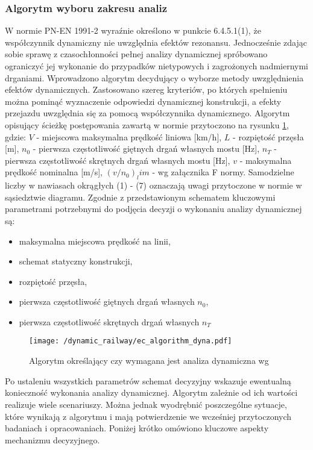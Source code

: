 \subsubsection{Algorytm wyboru zakresu analiz}
W normie PN-EN 1991-2 wyraźnie określono w punkcie 6.4.5.1(1), że współczynnik dynamiczny nie uwzględnia efektów rezonansu. Jednocześnie zdając sobie sprawę z czasochłonności pełnej analizy dynamicznej spróbowano ograniczyć jej wykonanie do przypadków nietypowych i zagrożonych nadmiernymi drganiami. Wprowadzono algorytm decydujący o wyborze metody uwzględnienia efektów dynamicznych. Zastosowano szereg kryteriów, po których spełnieniu można pominąć wyznaczenie odpowiedzi dynamicznej konstrukcji, a efekty przejazdu uwzględnia się za pomocą współczynnika dynamicznego. Algorytm opisujący ścieżkę postępowania zawartą w normie przytoczono na rysunku \ref{fig:ec_algorithm_dyna}, gdzie: $V$ - miejscowa maksymalna prędkość liniowa [km/h], $L$ - rozpiętość przęsła [m], $n_0$ - pierwsza częstotliwość giętnych drgań własnych mostu [Hz], $n_T$ - pierwsza częstotliwość skrętnych drgań własnych mostu [Hz], $v$ - maksymalna prędkość nominalna [m/s], $(v/n_0)_lim$ - wg załącznika F normy. Samodzielne liczby w nawiasach okrągłych (1) - (7) oznaczają uwagi przytoczone w normie w sąsiedztwie diagramu. Zgodnie z przedstawionym schematem kluczowymi parametrami potrzebnymi do podjęcia decyzji o wykonaniu analizy dynamicznej są:
\begin{itemize}[noitemsep]
	\item maksymalna miejscowa prędkość na linii,
	\item schemat statyczny konstrukcji,
	\item rozpiętość przęsła,
	\item pierwsza częstotliwość giętnych drgań własnych $n_0$,
	\item pierwsza częstotliwość skrętnych drgań własnych $n_T$
\end{itemize}
\begin{figure}[p]
	\centering
	\texttt{[image: /dynamic\_railway/ec\_algorithm\_dyna.pdf]} 
	\captionsetup{justification=centering}
	\caption{Algorytm określający czy wymagana jest analiza dynamiczna wg \parencite{PKNj}}
	\label{fig:ec_algorithm_dyna}
\end{figure}

Po ustaleniu wszystkich parametrów schemat decyzyjny wskazuje ewentualną konieczność wykonania analizy dynamicznej. Algorytm zależnie od ich wartości realizuje wiele scenariuszy. Można jednak wyodrębnić poszczególne sytuacje, które wynikają z algorytmu i mają potwierdzenie we wcześniej przytoczonych badaniach i opracowaniach. Poniżej krótko omówiono kluczowe aspekty mechanizmu decyzyjnego. 


